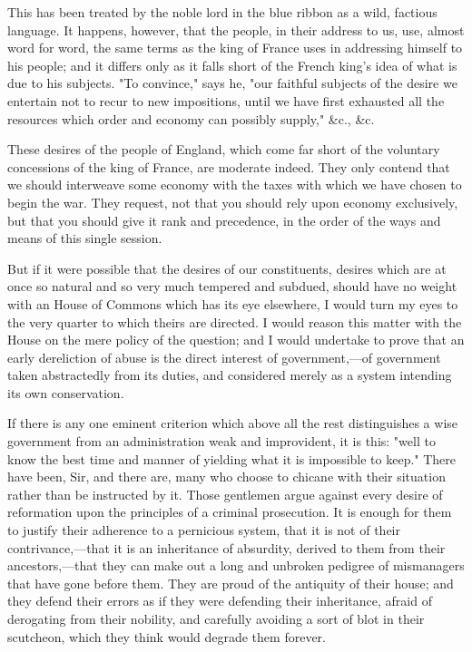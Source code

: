 This has been treated by the noble lord in the blue ribbon as a wild, factious language. It happens, however, that the people, in their address to us, use, almost word for word, the same terms as the king of France uses in addressing himself to his people; and it differs only as it falls short of the French king's idea of what is due to his subjects. "To convince," says he, "our faithful subjects of the desire we entertain not to recur to new impositions, until we have first exhausted all the resources which order and economy can possibly supply," \&c., \&c.

These desires of the people of England, which come far short of the voluntary concessions of the king of France, are moderate indeed. They only contend that we should interweave some economy with the taxes with which we have chosen to begin the war. They request, not that you should rely upon economy exclusively, but that you should give it rank and precedence, in the order of the ways and means of this single session.

But if it were possible that the desires of our constituents, desires which are at once so natural and so very much tempered and subdued, should have no weight with an House of Commons which has its eye elsewhere, I would turn my eyes to the very quarter to which theirs are directed. I would reason this matter with the House on the mere policy of the question; and I would undertake to prove that an early dereliction of abuse is the direct interest of government,—of government taken abstractedly from its duties, and considered merely as a system intending its own conservation.

If there is any one eminent criterion which above all the rest distinguishes a wise government from an administration weak and improvident, it is this: "well to know the best time and manner of yielding what it is impossible to keep." There have been, Sir, and there are, many who choose to chicane with their situation rather than be instructed by it. Those gentlemen argue against every desire of reformation upon the principles of a criminal prosecution. It is enough for them to justify their adherence to a pernicious system, that it is not of their contrivance,—that it is an inheritance of absurdity, derived to them from their ancestors,—that they can make out a long and unbroken pedigree of mismanagers that have gone before them. They are proud of the antiquity of their house; and they defend their errors as if they were defending their inheritance, afraid of derogating from their nobility, and carefully avoiding a sort of blot in their scutcheon, which they think would degrade them forever.


